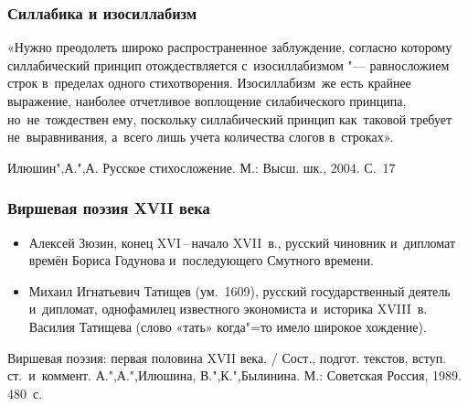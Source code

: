 \documentclass{beamer}
\begin{document}

\begin{frame}
\frametitle{Силлабика и изосиллабизм}

«Нужно преодолеть широко распространенное заблуждение, согласно которому силлабический принцип отождествляется с~изосиллабизмом "--- равносложием строк в~пределах одного стихотворения. Изосиллабизм~же есть крайнее выражение, наиболее отчетливое воплощение силабического принципа, но~не~тождествен ему, поскольку силлабический принцип как~таковой требует не~выравнивания, а~всего лишь учета количества слогов в~строках».

{\scriptsize Илюшин",А.",А. Русское стихосложение. М.: Высш. шк., 2004. С.~17}

\end{frame}




\begin{frame}
\frametitle{Виршевая поэзия XVII века}
\begin{itemize}
\item Алексей Зюзин, конец XVI\,--\,начало XVII~в., русский чиновник и~дипломат времён Бориса Годунова и~последующего Смутного времени.
\item Михаил Игнатьевич Татищев (ум.~1609), русский государственный деятель и~дипломат, однофамилец известного экономиста и~историка XVIII~в. Василия Татищева (слово «тать» когда"=то имело широкое хождение).
\end{itemize}

{\scriptsize Виршевая поэзия: первая половина XVII века. / Сост., подгот. текстов, вступ. ст.~и~коммент. А.",А.",Илюшина, В.",К.",Былинина. М.: Советская Россия, 1989. 480~с.}
\end{frame}

\end{document}
